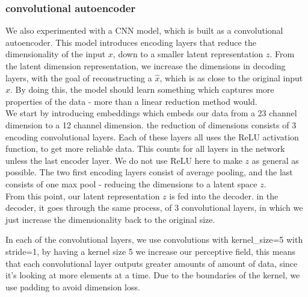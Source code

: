 \subsubsection{convolutional autoencoder}

We also experimented with a CNN model, which is built as a convolutional autoencoder. This model introduces encoding layers that reduce the dimensionality of the input $x$, down to a smaller latent representation $z$. From the latent dimension representation, we increase the dimensions in decoding layers, with the goal of reconstructing a $\hat{x}$, which is as close to the original input $x$. By doing this, the model should learn something which captures more properties of the data - more than a linear reduction method would. \\

\noindent
We start by introducing embeddings which embeds our data from a 23 channel dimension to a 12 channel dimension. the reduction of dimensions consists of 3 encoding convolutional layers. Each of these layers all uses the ReLU activation function, to get more reliable data. This counts for all layers in the network unless the last encoder layer. We do not use ReLU here to make $z$ as general as possible. The two first encoding layers consist of average pooling, and the last consists of one max pool - reducing the dimensions to a latent space $z$.  \\


\noindent
From this point, our latent representation $z$ is fed into the decoder. in the decoder, it goes through the same process, of 3 convolutional layers, in which we just increase the dimensionality back to the original size.

\noindent
In each of the convolutional layers, we use convolutions with kernel\_size=5 with stride=1, by having a kernel size 5 we increase our perceptive field, this means that each convolutional layer outputs greater amounts of amount of data, since it's looking at more elements at a time. Due to the boundaries of the kernel, we use padding to avoid dimension loss.\\



